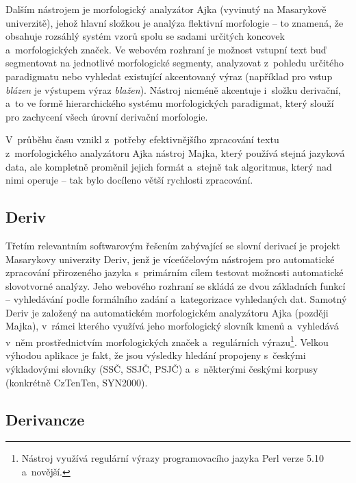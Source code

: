 Dalším nástrojem je morfologický analyzátor Ajka (vyvinutý na Masarykově
univerzitě), jehož hlavní složkou je analýza flektivní morfologie -- to
znamená, že obsahuje rozsáhlý systém vzorů spolu se sadami určitých
koncovek a~morfologických značek. Ve webovém rozhraní je možnost vstupní
text buď segmentovat na jednotlivé morfologické segmenty, analyzovat
z~pohledu určitého paradigmatu nebo vyhledat existující akcentovaný výraz
(například pro vstup \emph{blázen} je výstupem výraz \emph{blažen}).
Nástroj nicméně akcentuje i~složku derivační, a~to ve formě
hierarchického systému morfologických paradigmat, který slouží pro
zachycení všech úrovní derivační morfologie.~\parencite{ajka}

V~průběhu času vznikl z~potřeby efektivnějšího zpracování textu
z~morfologického analyzátoru Ajka nástroj Majka, který používá stejná
jazyková data, ale kompletně proměnil jejich formát a~stejně tak
algoritmus, který nad nimi operuje -- tak bylo docíleno větší rychlosti
zpracování.~\parencite{majka}

\hypertarget{deriv}{%
\subsection{Deriv}\label{deriv}}

Třetím relevantním softwarovým řešením zabývající se slovní derivací je
projekt Masarykovy univerzity Deriv, jenž je víceúčelovým nástrojem pro
automatické zpracování přirozeného jazyka s~primárním cílem testovat
možnosti automatické slovotvorné analýzy. Jeho webového rozhraní se
skládá ze dvou základních funkcí -- vyhledávání podle formálního zadání
a~kategorizace vyhledaných dat. Samotný Deriv je založený na
automatickém morfologickém analyzátoru Ajka (později Majka), v~rámci
kterého využívá jeho morfologický slovník kmenů a~vyhledává v~něm
prostřednictvím morfologických značek a~regulárních
výrazu\footnote{Nástroj využívá regulární výrazy programovacího jazyka Perl verze 5.10 a~novější.}.
Velkou výhodou aplikace je fakt, že jsou výsledky hledání propojeny
s~českými výkladovými slovníky (SSČ, SSJČ, PSJČ) a~s~některými českými
korpusy (konkrétně CzTenTen, SYN2000).~\parencite{deriv}

\hypertarget{derivancze}{%
\subsection{Derivancze}\label{derivancze}}

